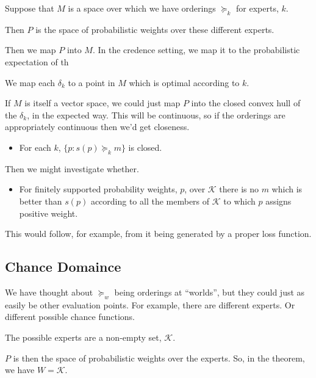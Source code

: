 \documentclass[11pt]{article}
\theoremstyle{definition}
\theoremstyle{remark}
\begin{document}
Suppose that $M$ is a space over which we have orderings $\succeq_k$ for experts, $k$. 

Then $P$ is the space of probabilistic weights over these different experts. 

Then we map $P$ into $M$. In the credence setting, we map it to the probabilistic expectation of th

We map each $\delta_k$ to a point in $M$ which is optimal according to $k$.

If $M$ is itself a vector space, we could just map $P$ into the closed convex hull of the $\delta_k$, in the expected way. This will be continuous, so if the orderings are appropriately continuous then we'd get closeness. 
\begin{itemize}
	\item For each $k$, $\{p : s(p)\succeq_k m\}$ is closed.
\end{itemize}
Then we might investigate whether. 
\begin{itemize}
	\item For finitely supported probability weights, $p$, over $\mathcal K$ there is no $m$ which is better than $s(p)$ according to all the members of $\mathcal K$ to which $p$ assigns positive weight. 
\end{itemize}
This would follow, for example, from it being generated by a proper loss function. 



\subsection{Chance Domaince}

We have thought about $\succeq_w$ being orderings at ``worlds'', but they could just as easily be other evaluation points. For example, there are different experts. Or different possible chance functions. 

The possible experts are a non-empty set, $\mathcal{K}$. 

$P$ is then the space of probabilistic weights over the experts. So, in the theorem, we have $W=\mathcal{K}$.
\end{document}
